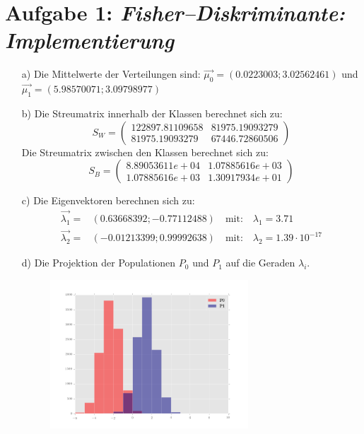 \section*{Aufgabe 1: \emph{Fisher--Diskriminante: Implementierung}}
\begin{itemize}
\item[a)] Die Mittelwerte der Verteilungen sind: $\vec{\mu_0} = (0.0223003 ; 3.02562461) $ und $\vec{\mu_1} = (5.98570071 ; 3.09798977)$

\item[b)] Die Streumatrix innerhalb der Klassen berechnet sich zu:
\begin{equation}
S_W = 	\begin{pmatrix} 122897.81109658 & 81975.19093279\\
 						81975.19093279 & 67446.72860506
 		\end{pmatrix} 
\end{equation}
Die Streumatrix zwischen den Klassen berechnet sich zu:
\begin{equation}
S_B = 	\begin{pmatrix}	8.89053611e+04  & 1.07885616e+03 \\
						1.07885616e+03  & 1.30917934e+01
 		\end{pmatrix} 
\end{equation}
\item[c)] Die Eigenvektoren berechnen sich zu:
\begin{align*}
\vec{\lambda_1} =& ( 0.63668392 ; -0.77112488 ) \quad \text{mit:}\quad \lambda_1 = 3.71 \\
\vec{\lambda_2} =& ( -0.01213399 ; 0.99992638 ) \quad \text{mit:}\quad \lambda_2 = 1.39 \cdot 10^{-17}
\end{align*}
\item[d)] Die Projektion der Populationen $P_0$ und $P_1$ auf die Geraden $\lambda_i$.
\begin{figure}[H]
	\centering
	\includegraphics[width=0.7\textwidth]{hist_0.png}

\end{figure}
\end{itemize}

